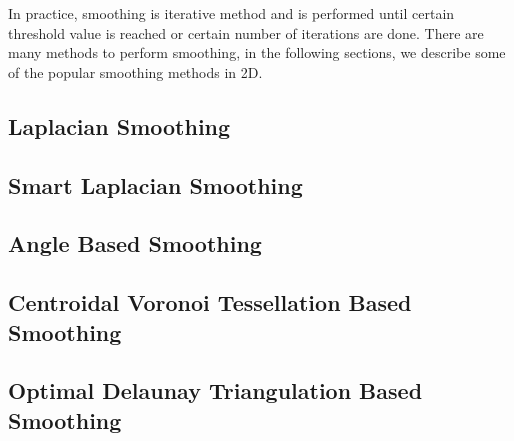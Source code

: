 In practice, smoothing is iterative method and is performed until certain threshold value is reached or certain number of iterations are done. There are many methods to perform smoothing, in the following sections, we describe some of the popular smoothing methods in 2D. 

\subsection{Laplacian Smoothing}
\subsection{Smart Laplacian Smoothing}
\subsection{Angle Based Smoothing}
\subsection{Centroidal Voronoi Tessellation Based Smoothing}
\subsection{Optimal Delaunay Triangulation Based Smoothing}





